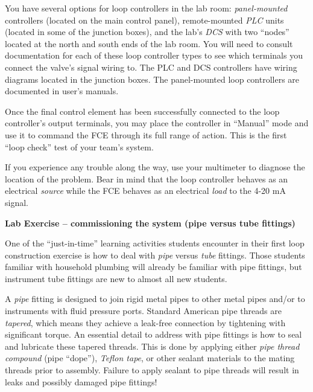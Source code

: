 \vskip 10pt

You have several options for loop controllers in the lab room: {\it panel-mounted} controllers (located on the main control panel), remote-mounted {\it PLC} units (located in some of the junction boxes), and the lab's {\it DCS} with two ``nodes'' located at the north and south ends of the lab room.  You will need to consult documentation for each of these loop controller types to see which terminals you connect the valve's signal wiring to.  The PLC and DCS controllers have wiring diagrams located in the junction boxes.  The panel-mounted loop controllers are documented in user's manuals.

Once the final control element has been successfully connected to the loop controller's output terminals, you may place the controller in ``Manual'' mode and use it to command the FCE through its full range of action.  This is the first ``loop check'' test of your team's system.

\vskip 10pt

If you experience any trouble along the way, use your multimeter to diagnose the location of the problem.  Bear in mind that the loop controller behaves as an electrical {\it source} while the FCE behaves as an electrical {\it load} to the 4-20 mA signal.










\vfil \eject

\noindent
{\bf Lab Exercise -- commissioning the system (pipe versus tube fittings)}

\vskip 5pt

One of the ``just-in-time'' learning activities students encounter in their first loop construction exercise is how to deal with {\it pipe} versus {\it tube} fittings.  Those students familiar with household plumbing will already be familiar with pipe fittings, but instrument tube fittings are new to almost all new students.

\vskip 10pt

A {\it pipe} fitting is designed to join rigid metal pipes to other metal pipes and/or to instruments with fluid pressure ports.  Standard American pipe threads are {\it tapered}, which means they achieve a leak-free connection by tightening with significant torque.  An essential detail to address with pipe fittings is how to seal and lubricate these tapered threads.  This is done by applying either {\it pipe thread compound} (pipe ``dope''), {\it Teflon tape}, or other sealant materials to the mating threads prior to assembly.  Failure to apply sealant to pipe threads will result in leaks and possibly damaged pipe fittings!

